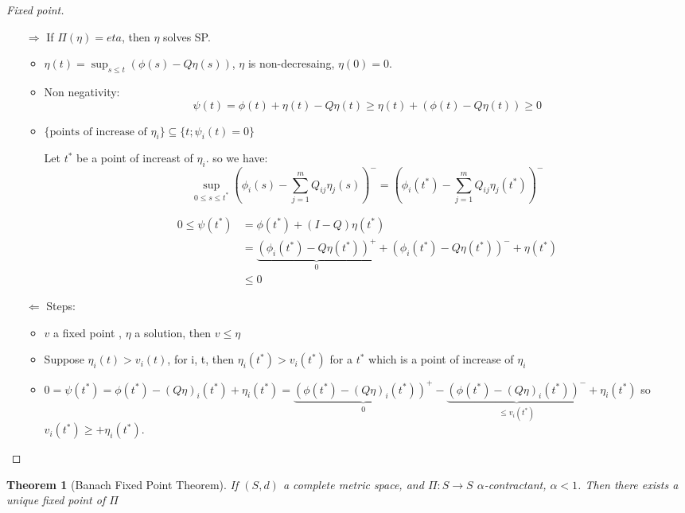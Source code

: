 \documentclass{article} \usepackage[utf8]{inputenc}
\newtheorem{theorem}{Theorem}
\begin{document}
  \begin{proof}[Fixed point]
    \begin{itemize}
    \item[$\Rightarrow$] If $\Pi(\eta) = eta$, then $\eta$ solves SP.
      \begin{itemize}
      \item $\eta(t) = \sup_{s \le t}(\phi(s) - Q\eta(s))$, $\eta$ is  non-decresaing, $\eta(0) = 0$. 
      \item Non negativity:
        $$\psi(t) = \phi(t) + \eta(t) - Q \eta(t) \ge \eta(t) + (\phi(t) - Q\eta(t)) \ge 0$$
      \item $\{ \text{points of increase of } \eta_i \} \subseteq \{ t; \psi_i(t) = 0\}$

        Let $t^*$ be a point of increast of $\eta_i$. so we have:
        $$\sup_{0 \le s \le t^*} (\phi_i(s) - \sum_{j=1}^m Q_{ij} \eta_j(s))^- = (\phi_i(t^*) - \sum_{j=1}^m Q_{ij} \eta_j(t^*))^- $$

        
        \begin{align*}
          0 \le \psi(t^*) &= \phi(t^*) + (I-Q)\eta(t^*) \\
                    &= \underbrace{(\phi_i(t^*) - Q \eta(t^*))^+}_0 + (\phi_i(t^*) - Q \eta(t^*))^- + \eta(t^*)\\
                    &\le 0
        \end{align*}

      \end{itemize}
    \item[$\Leftarrow$]
      Steps:
      \begin{itemize}
      \item $v$ a fixed point , $\eta$ a solution, then $v \le \eta$
      \item Suppose $\eta_i(t) > v_i(t)$, for i, t, then $\eta_i(t^*) > v_i(t^*)$ for a $t^*$ which is a point of increase of $\eta_i$
      \item $0 = \psi(t^*) = \phi(t^*) - (Q\eta)_i(t^*) + \eta_i(t^*) =  \underbrace{( \phi(t^*) - (Q\eta)_i(t^*) )^+}_0 - \underbrace{(\phi(t^*) - (Q\eta)_i(t^*))^-}_{\le v_i(t^*)} + \eta_i(t^*)$
        so $v_i(t^*) \ge  + \eta_i(t^*)$.
      \end{itemize}
    \end{itemize}
  \end{proof}
  \begin{theorem}[Banach Fixed Point Theorem]
    If $(S, d)$ a complete metric space, and $\Pi: S \rightarrow S$ $\alpha$-contractant, $\alpha < 1$.
    Then there exists a unique fixed point of $\Pi$
  \end{theorem}
\end{document}
